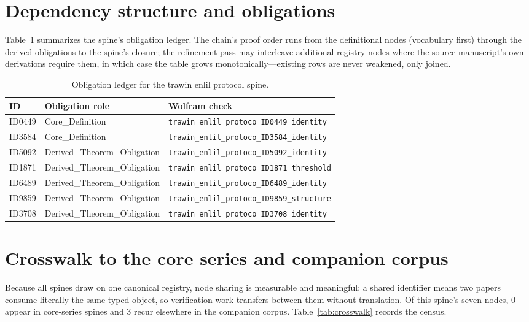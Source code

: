 \documentclass[11pt]{article}
\theoremstyle{remark}
\begin{document}
\section{Dependency structure and obligations}
\label{sec:dep}

Table~\ref{tab:obligations} summarizes the spine's obligation ledger. The chain's proof order runs from the definitional nodes (vocabulary first) through the derived obligations to the spine's closure; the refinement pass may interleave additional registry nodes where the source manuscript's own derivations require them, in which case the table grows monotonically---existing rows are never weakened, only joined.

\begin{table}[ht]
\centering
\small
\caption{Obligation ledger for the trawin enlil protocol spine.}
\label{tab:obligations}
\begin{tabular}{llp{6.2cm}}
\toprule
ID & Obligation role & Wolfram check \\
\midrule
ID0449 & Core\_Definition & \texttt{trawin\_enlil\_protoco\_ID0449\_identity} \\
ID3584 & Core\_Definition & \texttt{trawin\_enlil\_protoco\_ID3584\_identity} \\
ID5092 & Derived\_Theorem\_Obligation & \texttt{trawin\_enlil\_protoco\_ID5092\_identity} \\
ID1871 & Derived\_Theorem\_Obligation & \texttt{trawin\_enlil\_protoco\_ID1871\_threshold} \\
ID6489 & Derived\_Theorem\_Obligation & \texttt{trawin\_enlil\_protoco\_ID6489\_identity} \\
ID9859 & Derived\_Theorem\_Obligation & \texttt{trawin\_enlil\_protoco\_ID9859\_structure} \\
ID3708 & Derived\_Theorem\_Obligation & \texttt{trawin\_enlil\_protoco\_ID3708\_identity} \\
\bottomrule
\end{tabular}
\end{table}

\section{Crosswalk to the core series and companion corpus}
\label{sec:crosswalk}

Because all spines draw on one canonical registry, node sharing is measurable and meaningful: a shared identifier means two papers consume literally the same typed object, so verification work transfers between them without translation. Of this spine's seven nodes, 0 appear in core-series spines and 3 recur elsewhere in the companion corpus. Table~\ref{tab:crosswalk} records the census.
\end{document}
